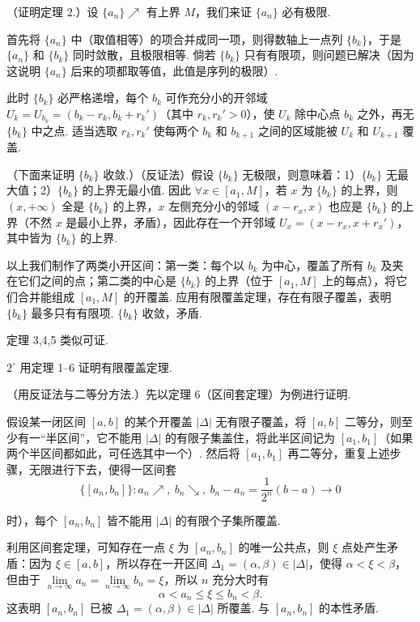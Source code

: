 \documentclass[UTF8, 12pt, fontset=fandol, oneside]{ctexart}
\begin{document}
（证明定理 2.）设 $\{a_n\}\nearrow$ 有上界 $M$，我们来证 $\{a_n\}$ 必有极限.

首先将 $\{a_n\}$ 中（取值相等）的项合并成同一项，则得数轴上一点列 $\{b_k\}$，于是 $\{a_n\}$ 和 $\{b_k\}$ 同时敛散，且极限相等. 倘若 $\{b_k\}$ 只有有限项，则问题已解决（因为这说明 $\{a_n\}$ 后来的项都取等值，此值是序列的极限）.

此时 $\{b_k\}$ 必严格递增，每个 $b_k$ 可作充分小的开邻域 $U_k=U_{b_k}=(b_k-r_k,b_k+r_k')$（其中 $r_k,r_k'>0$），使 $U_k$ 除中心点 $b_k$ 之外，再无 $\{b_k\}$ 中之点. 适当选取 $r_k,r_k'$ 使每两个 $b_k$ 和 $b_{k+1}$ 之间的区域能被 $U_k$ 和 $U_{k+1}$ 覆盖.

（下面来证明 $\{b_k\}$ 收敛.）（反证法）假设 $\{b_k\}$ 无极限，则意味着：1）$\{b_k\}$ 无最大值；2）$\{b_k\}$ 的上界无最小值. 因此 $\forall x\in[a_1,M]$，若 $x$ 为 $\{b_k\}$ 的上界，则 $(x,+\infty)$ 全是 $\{b_k\}$ 的上界，$x$ 左侧充分小的邻域 $(x-r_x,x)$ 也应是 $\{b_k\}$ 的上界（不然 $x$ 是最小上界，矛盾），因此存在一个开邻域 $U_x=(x-r_x,x+r_x')$，其中皆为 $\{b_k\}$ 的上界.

以上我们制作了两类小开区间：第一类：每个以 $b_k$ 为中心，覆盖了所有 $b_k$ 及夹在它们之间的点；第二类的中心是 $\{b_k\}$ 的上界（位于 $[a_1,M]$ 上的每点），将它们合并能组成 $[a_1,M]$ 的开覆盖. 应用有限覆盖定理，存在有限子覆盖，表明 $\{b_k\}$ 最多只有有限项. $\{b_k\}$ 收敛，矛盾.

定理 3,4,5 类似可证.

$2^\circ$ 用定理 1--6 证明有限覆盖定理.

（用反证法与二等分方法.）先以定理 6（区间套定理）为例进行证明.

假设某一闭区间 $[a,b]$ 的某个开覆盖 $|\Delta|$ 无有限子覆盖，将 $[a,b]$ 二等分，则至少有一“半区间”，它不能用 $|\Delta|$ 的有限子集盖住，将此半区间记为 $[a_1,b_1]$（如果两个半区间都如此，可任选其中一个）. 然后将 $[a_1,b_1]$ 再二等分，重复上述步骤，无限进行下去，便得一区间套
\[
  \{[a_n,b_n]\}: a_n\nearrow,\ b_n\searrow,\ b_n-a_n=\frac1{2^n}(b-a)\to0
\]

时），每个 $[a_n,b_n]$ 皆不能用 $|\Delta|$ 的有限个子集所覆盖.

利用区间套定理，可知存在一点 $\xi$ 为 $[a_n,b_n]$ 的唯一公共点，则 $\xi$ 点处产生矛盾：因为 $\xi\in[a,b]$，所以存在一开区间 $\Delta_1=(\alpha,\beta)\in|\Delta|$，使得 $\alpha<\xi<\beta$，但由于 $\lim\limits_{n\to\infty}a_n=\lim\limits_{n\to\infty}b_n=\xi$，所以 $n$ 充分大时有
\[
  \alpha<a_n\le \xi\le b_n<\beta.
\]
这表明 $[a_n,b_n]$ 已被 $\Delta_1=(\alpha,\beta)\in|\Delta|$ 所覆盖. 与 $[a_n,b_n]$ 的本性矛盾.
\end{document}
